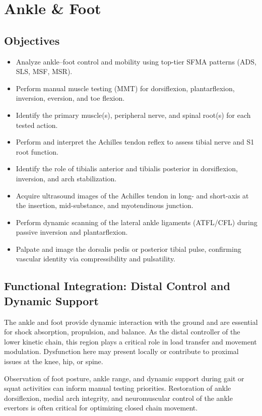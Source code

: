 \chapter{Ankle \& Foot}\label{chp:ankle_foot}

\section*{Objectives}

\begin{itemize}
  \item Analyze ankle–foot control and mobility using top-tier SFMA patterns (ADS, SLS, MSF, MSR).
  \item Perform manual muscle testing (MMT) for dorsiflexion, plantarflexion, inversion, eversion, and toe flexion.
  \item Identify the primary muscle(s), peripheral nerve, and spinal root(s) for each tested action.
  \item Perform and interpret the Achilles tendon reflex to assess tibial nerve and S1 root function.
  \item Identify the role of tibialis anterior and tibialis posterior in dorsiflexion, inversion, and arch stabilization.
  \item Acquire ultrasound images of the Achilles tendon in long- and short-axis at the insertion, mid-substance, and myotendinous junction.
  \item Perform dynamic scanning of the lateral ankle ligaments (ATFL/CFL) during passive inversion and plantarflexion.
  \item Palpate and image the dorsalis pedis or posterior tibial pulse, confirming vascular identity via compressibility and pulsatility.
\end{itemize}

\section*{Functional Integration: Distal Control and Dynamic Support}

The ankle and foot provide dynamic interaction with the ground and are essential for shock absorption, propulsion, and balance. As the distal controller of the lower kinetic chain, this region plays a critical role in load transfer and movement modulation. Dysfunction here may present locally or contribute to proximal issues at the knee, hip, or spine. 

Observation of foot posture, ankle range, and dynamic support during gait or squat activities can inform manual testing priorities. Restoration of ankle dorsiflexion, medial arch integrity, and neuromuscular control of the ankle evertors is often critical for optimizing closed chain movement.

